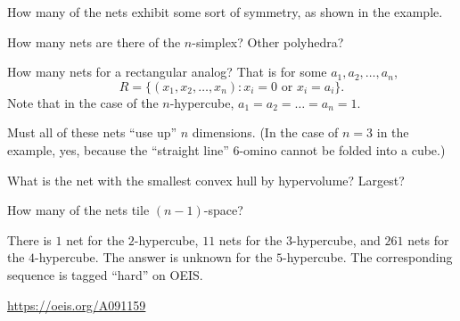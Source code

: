 \documentclass{article}
\begin{document}
\begin{related}
  \item How many of the nets exhibit some sort of symmetry, as shown in the example.
  \item How many nets are there of the $n$-simplex? Other polyhedra?
  \item How many nets for a rectangular analog? That is for some $a_1, a_2, \hdots, a_n$, \[
    R = \{(x_1, x_2, \hdots, x_n) : x_i = 0 \text{ or } x_i = a_i\}.
  \] Note that in the case of the $n$-hypercube, $a_1 = a_2 = \hdots = a_n = 1$.
  \item Must all of these nets ``use up'' $n$ dimensions.
  (In the case of $n=3$ in the example, yes, because the ``straight line''
  $6$-omino cannot be folded into a cube.)
  \item What is the net with the smallest convex hull by hypervolume? Largest?
  \item How many of the nets tile $(n-1)$-space?
\end{related}

\begin{note}
  There is $1$ net for the $2$-hypercube, $11$ nets for the $3$-hypercube,
  and $261$ nets for the $4$-hypercube.
  The answer is unknown for the $5$-hypercube.
  The corresponding sequence is tagged ``hard'' on OEIS.
\end{note}

\begin{references}
  \item \url{https://oeis.org/A091159}
\end{references}
\end{document}
